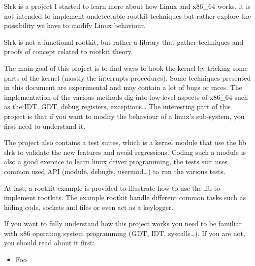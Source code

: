 Slrk is a project I started to learn more about how Linux and x86\_64 works,
it is not intended to implement undetectable rootkit techniques but rather
explore the possibility we have to modify Linux behaviour.

Slrk is not a functional rootkit, but rather a library that gather techniques
and proofs of concept related to rootkit theory.

The main goal of this project is to find ways to hook the kernel by tricking
some parts of the kernel (mostly the interrupts procedures).
Some techniques presented in this document are experimental and may contain
a lot of bugs or races.
The implementation of the various methods dig into low-level aspects of
x86\_64 such as the IDT, GDT, debug registers, exceptions…
The interesting part of this project is that if you want to modify the
behaviour of a linux's sub-system, you first need to understand it.

The project also contains a test suites, which is a kernel module that use
the lib slrk to validate the new features and avoid regressions.
Coding such a module is also a good exercice to learn linux driver programming,
the tests suit uses common used API (module, debugfs, usermod…) to run the
various tests.

At last, a rootkit example is provided to illustrate how to use the lib to
implement rootkits. The example rootkit handle different common tasks such
as hiding code, sockets and files or even act as a keylogger.


If you want to fully understand how this project works you need to be familiar
with x86 operating system programming (GDT, IDT, syscalls…). If you are not,
you should read about it first:
\begin{itemize}
  \item Foo
\end{itemize}
